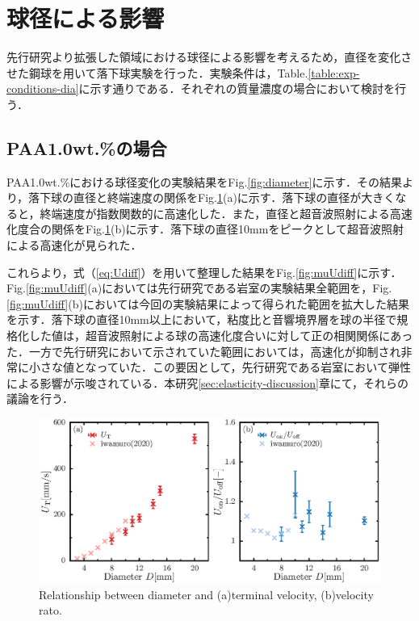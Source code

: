 \section{球径による影響}
\label{sec:diameter}
先行研究より拡張した領域における球径による影響を考えるため，直径を変化させた鋼球を用いて落下球実験を行った．実験条件は，Table.\ref{table:exp-conditions-dia}に示す通りである．それぞれの質量濃度の場合において検討を行う．

\subsection{PAA1.0wt.\%の場合}
PAA1.0wt.\%における球径変化の実験結果をFig.\ref{fig:diameter}に示す．その結果より，落下球の直径と終端速度の関係をFig.\ref{fig:diaUT}(a)に示す．落下球の直径が大きくなると，終端速度が指数関数的に高速化した．また，直径と超音波照射による高速化度合の関係をFig.\ref{fig:diaUT}(b)に示す．落下球の直径10mmをピークとして超音波照射による高速化が見られた．

これらより，式（\ref{eq:Udiff}）を用いて整理した結果をFig.\ref{fig:muUdiff}に示す．Fig.\ref{fig:muUdiff}(a)においては先行研究である岩室\cite{ref:8}の実験結果全範囲を，Fig.\ref{fig:muUdiff}(b)においては今回の実験結果によって得られた範囲を拡大した結果を示す．落下球の直径10mm以上において，粘度比と音響境界層を球の半径で規格化した値は，超音波照射による球の高速化度合いに対して正の相関関係にあった．一方で先行研究において示されていた範囲においては，高速化が抑制され非常に小さな値となっていた．この要因として，先行研究である岩室\cite{ref:8}において弾性による影響が示唆されている．本研究\ref{sec:elasticity-discussion}章にて，それらの議論を行う．

\begin{figure}[ht]
    \centering
    \includegraphics[width=1\textwidth]{./5-Results/diaUT_Udiff.eps}
    \caption{Relationship between diameter and (a)terminal velocity, (b)velocity rato.}
    \label{fig:diaUT}
\end{figure}

